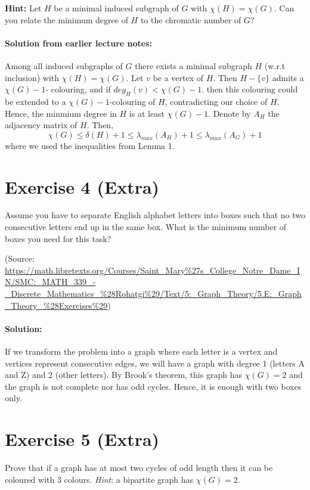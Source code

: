 \documentclass{article}
\begin{document}
\textbf{Hint:} Let $H$ be a minimal induced subgraph of $G$ with $\chi(H) = \chi(G)$. Can you relate the minimum degree of $H$ to the chromatic number of $G$?
  
\paragraph{Solution from earlier lecture notes:} Among all induced subgraphs of $G$ there exists a minimal subgraph $H$ (w.r.t inclusion) with $\chi(H)= \chi(G)$. Let $v$ be a vertex of $H$. Then $H - \{v\}$ admits a $\chi(G) - 1$- colouring, and if $deg_{H}(v) < \chi(G) - 1$. then this colouring could be extended to a $\chi(G) - 1$-colouring of $H$, contradicting our choice of $H$. Hence, the minmium degree in $H$ is at least $\chi(G) - 1$. Denote by $A_{H}$ the adjacency matrix of $H$. Then, 
$$\chi(G) \leq \delta(H) + 1 \leq \lambda_{max}(A_{H}) + 1\leq \lambda_{max}(A_{G}) + 1$$
where we used the inequalities from Lemma 1.

\section*{Exercise 4 (Extra)}
Assume you have to separate English alphabet letters into boxes such that no two consecutive letters end up in the same box. What is the minimum number of boxes you need for this task?

\noindent
(Source: \url {https://math.libretexts.org/Courses/Saint_Mary%27s_College_Notre_Dame_IN/SMC:_MATH_339_-_Discrete_Mathematics_%28Rohatgi%29/Text/5:_Graph_Theory/5.E:_Graph_Theory_%28Exercises%29})

\paragraph{Solution:}
If we transform the problem into a graph where each letter is a vertex and vertices represent consecutive edges, we will have a graph with degree 1 (letters A and Z) and 2 (other letters). By Brook's theorem, this graph has $\chi(G) = 2$ and the graph is not complete nor has odd cycles. Hence, it is enough with two boxes only.

\section*{Exercise 5 (Extra)}
Prove that if a graph has at most two cycles of odd length then it can be coloured with 3 colours. \textit{Hint}: a bipartite graph has $\chi(G) = 2$.
\end{document}
